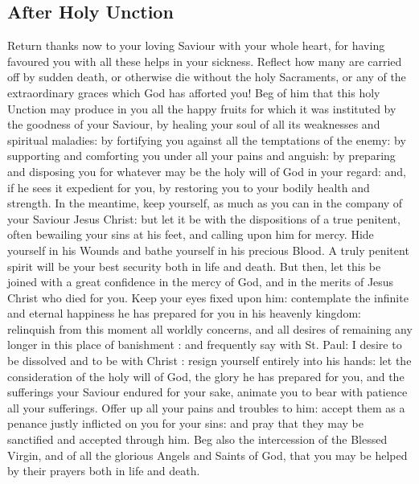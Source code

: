 \subsection{After Holy Unction}\par\noindent
Return thanks now to your loving Saviour with your whole heart, for having favoured you with all these helps in your sickness. Reflect how many are carried off by sudden death, or otherwise die without the holy Sacraments, or any of the extraordinary graces which God has afforted you! Beg of him that this holy Unction may produce in you all the happy fruits for which it was instituted by the goodness of your Saviour, by healing your soul of all its weaknesses and spiritual maladies: by fortifying you against all the temptations of the enemy: by supporting and comforting you under all your pains and anguish: by preparing and disposing you for whatever may be the holy will of God in your regard: and, if he sees it expedient for you, by restoring you to your bodily health and strength. In the meantime, keep yourself, as much as you can in the company of your Saviour Jesus Christ: but let it be with the dispositions of a true penitent, often bewailing your sins at his feet, and calling upon him for mercy. Hide yourself in his Wounds and bathe yourself in his precious Blood. A truly penitent spirit will be your best security both in life and death. But then, let this be joined with a great confidence in the mercy of God, and in the merits of Jesus Christ who died for you. Keep your eyes fixed upon him: contemplate the infinite and eternal happiness he has prepared for you in his heavenly kingdom: relinquish from this moment all worldly concerns, and all desires of remaining any longer in this place of banishment : and frequently say with St. Paul: I desire to be dissolved and to be with Christ : resign yourself entirely into his hands: let the consideration of the holy will of God, the glory he has prepared for you, and the sufferings your Saviour endured for your sake, animate you to bear with patience all your sufferings. Offer up all your pains and troubles to him: accept them as a penance justly inflicted on you for your sins: and pray that they may be sanctified and accepted through him. Beg also the intercession of the Blessed Virgin, and of all the glorious Angels and Saints of God, that you may be helped by their prayers both in life and death.
